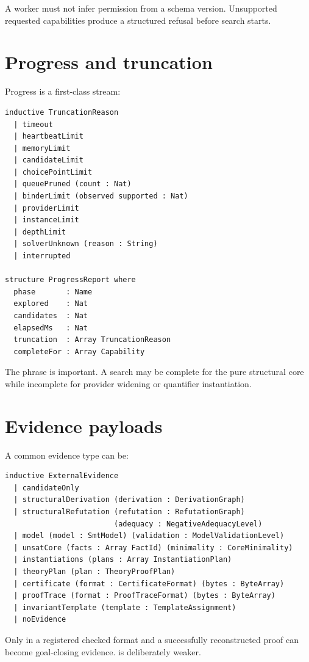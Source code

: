 \documentclass[11pt,letterpaper,openany]{report}
\newcommand{\code}[1]{\texttt{\detokenize{#1}}}
\begin{document}
A worker must not infer permission from a schema version. Unsupported requested
capabilities produce a structured refusal before search starts.

\section{Progress and truncation}

Progress is a first-class stream:

\begin{lstlisting}[language=LeanFour,caption={Schematic progress report}]
inductive TruncationReason
  | timeout
  | heartbeatLimit
  | memoryLimit
  | candidateLimit
  | choicePointLimit
  | queuePruned (count : Nat)
  | binderLimit (observed supported : Nat)
  | providerLimit
  | instanceLimit
  | depthLimit
  | solverUnknown (reason : String)
  | interrupted

structure ProgressReport where
  phase       : Name
  explored    : Nat
  candidates  : Nat
  elapsedMs   : Nat
  truncation  : Array TruncationReason
  completeFor : Array Capability
\end{lstlisting}

The phrase \code{completeFor} is important. A search may be complete for the pure
structural core while incomplete for provider widening or quantifier instantiation.

\section{Evidence payloads}

A common evidence type can be:

\begin{lstlisting}[language=LeanFour,caption={Schematic evidence vocabulary}]
inductive ExternalEvidence
  | candidateOnly
  | structuralDerivation (derivation : DerivationGraph)
  | structuralRefutation (refutation : RefutationGraph)
                         (adequacy : NegativeAdequacyLevel)
  | model (model : SmtModel) (validation : ModelValidationLevel)
  | unsatCore (facts : Array FactId) (minimality : CoreMinimality)
  | instantiations (plans : Array InstantiationPlan)
  | theoryPlan (plan : TheoryProofPlan)
  | certificate (format : CertificateFormat) (bytes : ByteArray)
  | proofTrace (format : ProofTraceFormat) (bytes : ByteArray)
  | invariantTemplate (template : TemplateAssignment)
  | noEvidence
\end{lstlisting}

Only \code{certificate} in a registered checked format and a successfully reconstructed
proof can become goal-closing evidence. \code{proofTrace} is deliberately weaker.
\end{document}
